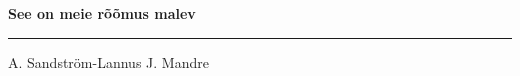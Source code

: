 \documentclass[10pt]{book}
\begin{document}
{
  \samepage
  \raggedbottom
  \raggedright
  \sloppy


  \vspace{0.2in}

  \noindent\begin{minipage}{.1\textwidth}
    \hfill\vspace{0.1in}
  \end{minipage}%
  \noindent\begin{minipage}{.8\textwidth}
    \centering
    \bfseries
    \large See on meie r\~o\~omus malev
  \end{minipage}%
  \noindent\begin{minipage}{.1\textwidth}
      \hfill\vspace{0.1in}
  \end{minipage}

  \nopagebreak[4]
  \vspace{0.1in}
  \nopagebreak[4]
  \hrule height 0.05ex
  \nopagebreak[4]
  \vspace{-0.05in}

  {\footnotesize A. Sandstr\"om-Lannus \hfill J. Mandre }\\
  \vspace{0.01in}



}
\end{document}
